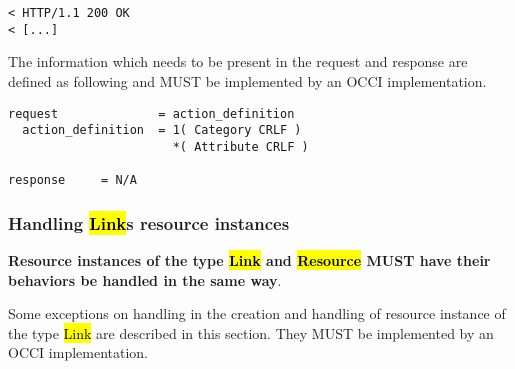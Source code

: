 \documentclass[10pt,a4paper]{article}
\begin{document}
\begin{description}
\begin{verbatim}
< HTTP/1.1 200 OK
< [...]
\end{verbatim}

    The information which needs to be present in the request and
    response are defined as following and MUST be implemented by an
    OCCI implementation.

\begin{verbatim}
request              = action_definition
  action_definition  = 1( Category CRLF )
                       *( Attribute CRLF )

response     = N/A
\end{verbatim}

\end{description}

\subsubsection{Handling \hl{Link}s resource instances}
\textbf{Resource instances of the type \hl{Link} and \hl{Resource}
  MUST have their behaviors be handled in the same way}. 
  
  Some exceptions on handling in the creation and handling of resource
instance of the type \hl{Link} are described in this section. They
MUST be implemented by an OCCI implementation.
\end{document}
